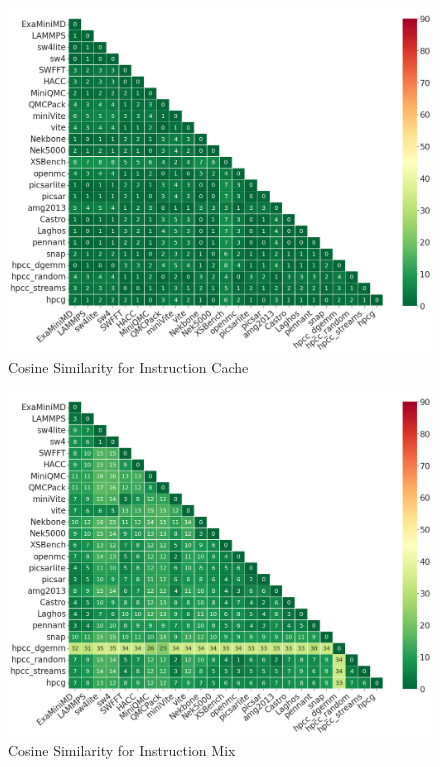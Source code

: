 \begin{figure}[ht]
\centering
\includegraphics[width=0.9\linewidth]{figs/Instruction_Cache.png}
\caption{Cosine Similarity for Instruction Cache }
\label{figs:cosine Instruction_Cache}
\end{figure}

\begin{figure}[ht]
\centering
\includegraphics[width=0.9\linewidth]{figs/Instruction_Mix.png}
\caption{Cosine Similarity for Instruction Mix }
\label{figs:cosine Instruction_Mix}
\end{figure}

